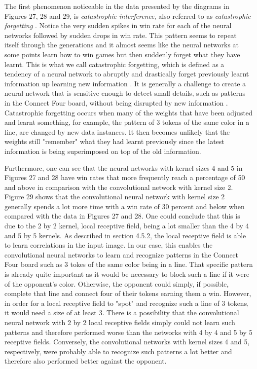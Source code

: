 \documentclass[titlepage]{article}
\begin{document}
\vskip 0.2cm

\noindent
The first phenomenon noticeable in the data presented by the diagrams in Figures 27, 28 and 29, is \emph{catastrophic interference}, also referred to as \emph{catastrophic forgetting} \cite{catastrophic}. Notice the very sudden spikes in win rate for each of the neural networks followed by sudden drops in win rate. This pattern seems to repeat itself through the generations and it almost seems like the neural networks at some points learn how to win games but then suddenly forget what they have learnt. This is what we call catastrophic forgetting, which is defined as a tendency of a neural network to abruptly and drastically forget previously learnt information up learning new information \cite{catastrophic}. It is generally a challenge to create a neural network that is sensitive enough to detect small details, such as patterns in the Connect Four board, without being disrupted by new information \cite{catastrophic}. Catastrophic forgetting occurs when many of the weights that have been adjusted and learnt something, for example, the pattern of 3 tokens of the same color in a line, are changed by new data instances. It then becomes unlikely that the weights still "remember" what they had learnt previously since the latest information is being superimposed on top of the old information.

\vskip 0.2cm

\noindent
Furthermore, one can see that the neural networks with kernel sizes 4 and 5 in Figures 27 and 28 have win rates that more frequently reach a percentage of 50 and above in comparison with the convolutional network with kernel size 2. Figure 29 shows that the convolutional neural network with kernel size 2 generally spends a lot more time with a win rate of 30 percent and below when compared with the data in Figures 27 and 28. One could conclude that this is due to the 2 by 2 kernel, local receptive field, being a lot smaller than the 4 by 4 and 5 by 5 kernels. As described in section 4.5.2, the local receptive field is able to learn correlations in the input image. In our case, this enables the convolutional neural networks to learn and recognize patterns in the Connect Four board such as 3 tokes of the same color being in a line. That specific pattern is already quite important as it would be necessary to block such a line if it were of the opponent's color. Otherwise, the opponent could simply, if possible, complete that line and connect four of their tokens earning them a win. However, in order for a local receptive field to "spot" and recognize such a line of 3 tokens, it would need a size of at least 3. There is a possibility that the convolutional neural network with 2 by 2 local receptive fields simply could not learn such patterns and therefore performed worse than the networks with 4 by 4 and 5 by 5 receptive fields. Conversely, the convolutional networks with kernel sizes 4 and 5, respectively, were probably able to recognize such patterns a lot better and therefore also performed better against the opponent.
\end{document}
